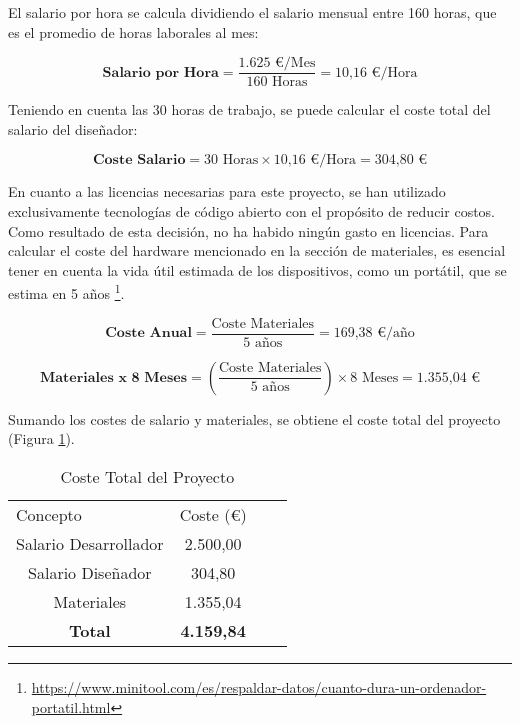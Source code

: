 El salario por hora se calcula dividiendo el salario mensual entre 160 horas, que es el promedio de horas laborales al mes:

\begin{equation}
    \textbf{Salario por Hora} = \frac {\text{1.625 €/Mes}}{160 \text{ Horas}} = \text{10,16 €/Hora}
\end{equation}

Teniendo en cuenta las 30 horas de trabajo, se puede calcular el coste total del salario del diseñador:

\begin{equation}
    \textbf{Coste Salario} = \text{30 Horas} \times \text{10,16 €/Hora} = \text{304,80 €}
\end{equation}

En cuanto a las licencias necesarias para este proyecto, se han utilizado exclusivamente tecnologías de código abierto con el propósito de reducir costos. Como resultado de esta decisión, no ha habido ningún gasto en licencias. Para calcular el coste del hardware mencionado en la sección de materiales, es esencial tener en cuenta la vida útil estimada de los dispositivos, como un portátil, que se estima en 5 años \footnote{\url{https://www.minitool.com/es/respaldar-datos/cuanto-dura-un-ordenador-portatil.html}}.

\begin{equation}
    \textbf{Coste Anual} = \frac {\text{Coste Materiales}}{\text{5 años}} = \text{169,38 €/año}
\end{equation}

\begin{equation}
    \textbf{Materiales x 8 Meses} = \left(\frac {\text{Coste Materiales}}{\text{5 años}}\right) \times 8 \text{ Meses} = \text{1.355,04 €}
\end{equation}

Sumando los costes de salario y materiales, se obtiene el coste total del proyecto (Figura \ref{tab:coste_total}).

\begin{table}[H]
    \centering
    \begin{tabular}{|c|c|ll}
    \cline{1-2}
    \multicolumn{1}{|l|}{Concepto} & \multicolumn{1}{l|}{Coste (€)} &  &  \\ \cline{1-2}
    Salario Desarrollador           & 2.500,00                        &  &  \\ \cline{1-2}
    Salario Diseñador               & 304,80                         &  &  \\ \cline{1-2}
    Materiales                      & 1.355,04                       &  &  \\ \cline{1-2}
    \textbf{Total}                   & \textbf{4.159,84}               &  &  \\ \cline{1-2}
    \end{tabular}
    \caption{Coste Total del Proyecto}
    \label{tab:coste_total}
\end{table}
